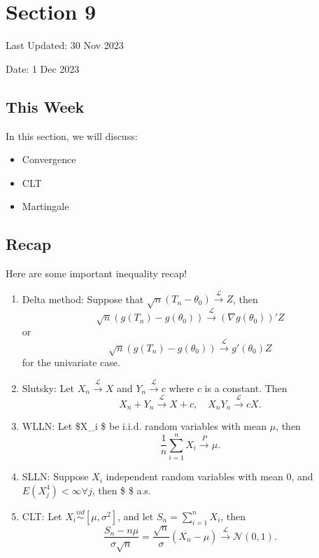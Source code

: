 \documentclass[
  letterpaper,
  DIV=11,
  numbers=noendperiod]{scrreprt}
\providecommand{\tightlist}{%
  \setlength{\itemsep}{0pt}\setlength{\parskip}{0pt}}\usepackage{longtable,booktabs,array}
\theoremstyle{definition}
\theoremstyle{plain}
\theoremstyle{remark}
\begin{document}
\hypertarget{section-9}{%
\chapter*{Section 9}\label{section-9}}


Last Updated: 30 Nov 2023

Date: 1 Dec 2023

\hypertarget{this-week-1}{%
\section*{This Week}\label{this-week-1}}


In this section, we will discuss:

\begin{itemize}
\tightlist
\item
  Convergence
\item
  CLT
\item
  Martingale
\end{itemize}

\hypertarget{recap-1}{%
\section*{Recap}\label{recap-1}}


Here are some important inequality recap!

\begin{enumerate}
\def\labelenumi{\arabic{enumi}.}
\item
  Delta method: Suppose that
  \(\sqrt{n} (T_n -\theta_0) \overset{\mathcal{L}}{\rightarrow} Z\),
  then
  \[\sqrt{n}\left( g(T_n) - g(\theta_0)  \right) \overset{\mathcal{L}}{\rightarrow} (\nabla g(\theta_0))' Z\]or
  \[\sqrt{n}\left( g(T_n) - g(\theta_0)  \right) \overset{\mathcal{L}}{\rightarrow}  g'(\theta_0) Z\]
  for the univariate case.
\item
  Slutsky: Let \(X_n \overset{\mathcal{L}}{\to}X\) and
  \(Y_n \overset{\mathcal{L}}{\to }c\) where \(c\) is a constant. Then
  \[X_n + Y_n \overset{\mathcal{L}}{\to } X + c, \quad X_nY_n \overset{\mathcal{L}}{\to} cX.\]
\item
  WLLN: Let \$X\_i \$ be i.i.d. random variables with mean \(\mu\), then
  \[\frac{1}{n} \sum_{i=1}^n X_i \overset{P}{\to } \mu.\]
\item
  SLLN: Suppose \(X_i\) independent random variables with mean \(0\),
  and \(E(X_j^4) < \infty \forall j\), then \$  \$
  a.s.
\item
  CLT: Let \(X_i \overset{iid}{\sim} [\mu,\sigma^2]\), and let
  \(S_n = \sum_{i=1}^{n} X_i\), then
  \[ \frac{S_n - n\mu}{\sigma \sqrt{n}}  = \frac{\sqrt{n}}{\sigma} (\overline{X_n} - \mu) \overset{\mathcal{L}}{\to }\mathcal{N}(0,1).\]
\end{enumerate}
\end{document}
